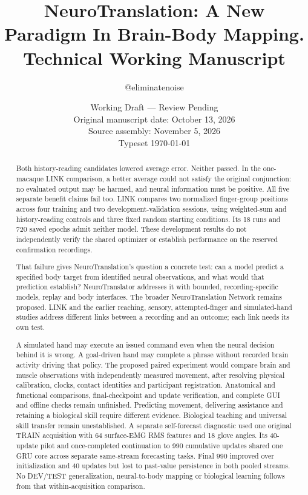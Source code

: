 \documentclass[11pt,a4paper]{article}
\begin{document}
\title{NeuroTranslation: A New Paradigm In Brain-Body Mapping.\\[.4em]\large Technical Working Manuscript}
\author{@eliminatenoise}
\date{Working Draft — Review Pending\\Original manuscript date: October 13, 2026\\Source assembly: November 5, 2026\\Typeset \today}
\maketitle

\begin{abstract}
Both history-reading candidates lowered average error. Neither passed. In the one-macaque LINK comparison, a better average could not satisfy the original conjunction: no evaluated output may be harmed, and neural information must be positive. All five separate benefit claims fail too. LINK compares two normalized finger-group positions across four training and two development-validation sessions, using weighted-sum and history-reading controls and three fixed random starting conditions. Its 18 runs and 720 saved epochs admit neither model. These development results do not independently verify the shared optimizer or establish performance on the reserved confirmation recordings.

That failure gives NeuroTranslation's question a concrete test: can a model predict a specified body target from identified neural observations, and what would that prediction establish? NeuroTranslator addresses it with bounded, recording-specific models, replay and body interfaces. The broader NeuroTranslation Network remains proposed. LINK and the earlier reaching, sensory, attempted-finger and simulated-hand studies address different links between a recording and an outcome; each link needs its own test.

A simulated hand may execute an issued command even when the neural decision behind it is wrong. A goal-driven hand may complete a phrase without recorded brain activity driving that policy. The proposed paired experiment would compare brain and muscle observations with independently measured movement, after resolving physical calibration, clocks, contact identities and participant registration. Anatomical and functional comparisons, final-checkpoint and update verification, and complete GUI and offline checks remain unfinished. Predicting movement, delivering assistance and retaining a biological skill require different evidence. Biological teaching and universal skill transfer remain unestablished.
A separate self-forecast diagnostic used one original TRAIN acquisition with 64 surface-EMG RMS features and 18 glove angles. Its 40-update pilot and once-completed continuation to 990 cumulative updates shared one GRU core across separate same-stream forecasting tasks. Final 990 improved over initialization and 40 updates but lost to past-value persistence in both pooled streams. No DEV/TEST generalization, neural-to-body mapping or biological learning follows from that within-acquisition comparison.
\end{abstract}
\end{document}
